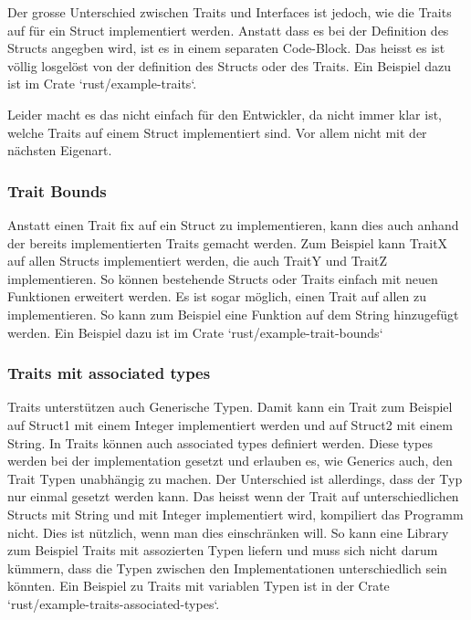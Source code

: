 \documentclass[letterpaper,12pt]{article}
\begin{document}
    Der grosse Unterschied zwischen Traits und Interfaces ist jedoch, wie die Traits auf für ein Struct implementiert werden.
    Anstatt dass es bei der Definition des Structs angegben wird, ist es in einem separaten Code-Block.
    Das heisst es ist völlig losgelöst von der definition des Structs oder des Traits.
    Ein Beispiel dazu ist im Crate `rust/example-traits`.

    Leider macht es das nicht einfach für den Entwickler, da nicht immer klar ist, welche Traits auf einem Struct implementiert sind.
    Vor allem nicht mit der nächsten Eigenart.

    \subsubsection{Trait Bounds}\label{subsubsec:trait-bounds}
    Anstatt einen Trait fix auf ein Struct zu implementieren, kann dies auch anhand der bereits implementierten Traits gemacht werden.
    Zum Beispiel kann TraitX auf allen Structs implementiert werden, die auch TraitY und TraitZ implementieren.
    So können bestehende Structs oder Traits einfach mit neuen Funktionen erweitert werden.
    Es ist sogar möglich, einen Trait auf allen zu implementieren.
    So kann zum Beispiel eine Funktion auf dem String hinzugefügt werden.
    Ein Beispiel dazu ist im Crate `rust/example-trait-bounds`

    \subsubsection{Traits mit associated types}\label{subsubsec:traits-associated-types}
    Traits unterstützen auch Generische Typen.
    Damit kann ein Trait zum Beispiel auf Struct1 mit einem Integer implementiert werden und auf Struct2 mit einem String.
    In Traits können auch associated types definiert werden.
    Diese types werden bei der implementation gesetzt und erlauben es, wie Generics auch, den Trait Typen unabhängig zu machen.
    Der Unterschied ist allerdings, dass der Typ nur einmal gesetzt werden kann.
    Das heisst wenn der Trait auf unterschiedlichen Structs mit String und mit Integer implementiert wird, kompiliert das Programm nicht.
    Dies ist nützlich, wenn man dies einschränken will.
    So kann eine Library zum Beispiel Traits mit assozierten Typen liefern und muss sich nicht darum kümmern,
        dass die Typen zwischen den Implementationen unterschiedlich sein könnten.
    Ein Beispiel zu Traits mit variablen Typen ist in der Crate `rust/example-traits-associated-types`.
\end{document}
